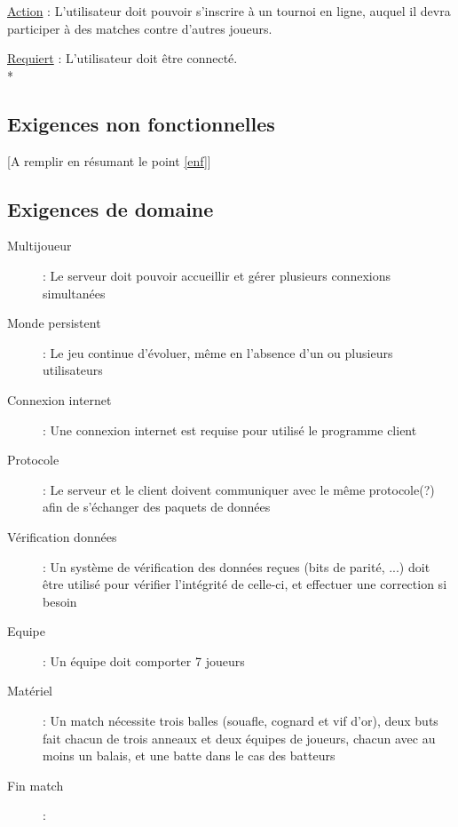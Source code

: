 \documentclass[a4paper]{article}
\begin{document}
\begin{description}[style=nextline]
			\item[Tournois :]
			\begin{description}[leftmargin=*] %
				\item[]
				\item \underline{Action} : L'utilisateur doit pouvoir s'inscrire à un tournoi en ligne, auquel il devra participer à des matches contre d'autres joueurs.
				\item \underline{Requiert} : L'utilisateur doit être connecté.\\*
			\end{description} %
			
		\end{description}

\subsection{Exigences non fonctionnelles}
[A remplir en résumant le point \ref{enf}]

\subsection{Exigences de domaine}
\begin{description}
	\item[Multijoueur] : Le serveur doit pouvoir accueillir et gérer plusieurs connexions simultanées
	\item[Monde persistent] : Le jeu continue d'évoluer, même en l'absence d'un ou plusieurs utilisateurs
	\item[Connexion internet] : Une connexion internet est requise pour utilisé le programme client
	\item[Protocole] : Le serveur et le client doivent communiquer avec le même protocole(?) afin de s'échanger des paquets de données
	\item[Vérification données] : Un système de vérification des données reçues (bits de parité, ...) doit être utilisé pour vérifier l'intégrité de celle-ci, et effectuer une correction si besoin
	\item[Equipe] : Un équipe doit comporter 7 joueurs
	\item[Matériel] : Un match nécessite trois balles (souafle, cognard et vif d'or), deux buts fait chacun de trois anneaux et deux équipes de joueurs, chacun avec au moins un balais, et une batte dans le cas des batteurs
	\item[Fin match] : 
\end{description}
\end{document}
